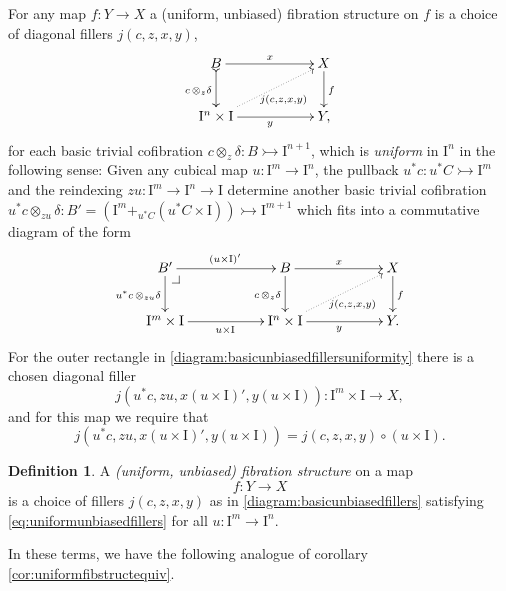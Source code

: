 \documentclass[12pt]{article}
\makeatletter
\newcommand{\mono}{\ensuremath{\rightarrowtail}}
\newcommand{\ra}{\ensuremath{\rightarrow}}
\newcommand{\I}{\ensuremath{\mathrm{I}}}
\theoremstyle{remark}
\theoremstyle{definition}
\newtheorem{definition}[theorem]{Definition}
\newcommand{\pbcorner}[1][dr]{\save*!/#1-1.2pc/#1:(-1,1)@^{|-}\restore}
\makeatother
\begin{document}
For any map $f:Y\ra X$  a (uniform, unbiased) fibration structure on $f$ is a choice of diagonal fillers $j(c,z,x,y)$,
\begin{equation}\label{diagram:basicunbiasedfillers}
\xymatrix{
B \ar@{>->}[d]_{c\,\otimes_z\delta} \ar[rr]^x && X \ar[d]^f \\
\I^{n}\times \I \ar@{.>}[rru]_{j(c,z,x,y)} \ar[rr]_y && Y,
}
\end{equation}
for each basic trivial cofibration $c \otimes_z \delta : B \mono \I^{n+1}$, which is \emph{uniform} in $\I^n$ in the following sense: Given any cubical map $u : \I^m \ra \I^n$, the pullback $u^*c : u^*C\mono \I^m$ and the reindexing $zu : \I^m \ra \I^n\ra\I$ determine another basic trivial cofibration $u^*c \otimes_{zu} \delta : B' = (\I^m +_{u^*C} (u^*C\times\I)) \mono \I^{m+1}$ which fits into a commutative diagram of the form
\begin{equation}\label{diagram:basicunbiasedfillersuniformity}
\xymatrix{
B' \ar[d]_{u^*c\,\otimes_{zu}\delta} \ar[rr]^{(u\times \I)'} \pbcorner  && B \ar[d]_{c\,\otimes_z\delta} \ar[rr]^x && X \ar[d]^f \\
\I^{m}\times \I  \ar[rr]_{u\times \I} && \I^{n}\times \I \ar@{.>}[rru]_{j(c,z,x,y)} \ar[rr]_y && Y.
}
\end{equation}
For the outer rectangle in \eqref{diagram:basicunbiasedfillersuniformity} there is a chosen diagonal filler 
$$j(u^*c,zu,x(u\times \I)', y(u\times \I)): \I^m\times\I\ra X,$$ and for this map we require that
\begin{equation}\label{eq:uniformunbiasedfillers}
j(u^*c,zu,x(u\times \I)', y(u\times \I)) = j(c,z,x,y)\circ (u\times \I).
\end{equation}

\begin{definition}\label{def:unbiasedfibstructure} A \emph{(uniform, unbiased) fibration structure} on a map $$f: Y\ra X$$ is a choice of fillers $j(c,z,x,y)$ as in \eqref{diagram:basicunbiasedfillers} satisfying \eqref{eq:uniformunbiasedfillers} for all $u : \I^m\ra\I^n$.
\end{definition}

In these terms, we have the following analogue of corollary \ref{cor:uniformfibstructequiv}.
\end{document}
